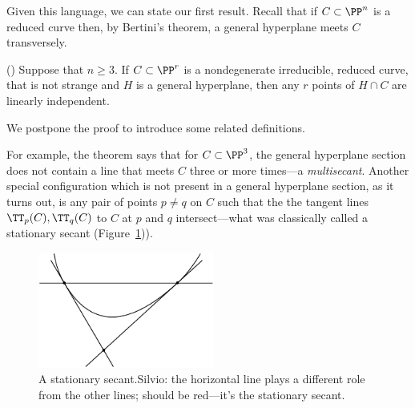 Given this language, we can state our first result. Recall that if $C\subset \PP^n$ is a reduced curve then, by Bertini's theorem, a general hyperplane meets $C$ transversely.

\begin{theorem} \label{basic linear independence}(\cite[Lemma 1.1]{Rathmann})\label{linear general position}
Suppose that $n\geq 3$. If $C\subset \PP^r$ is a nondegenerate irreducible, reduced curve, that is not strange
and $H$ is a general hyperplane, then any $r$ points of $H\cap C$ are
linearly independent.
\end{theorem}

We postpone the proof to introduce some related definitions.

For example, the theorem says that for $C \subset \PP^3$, the general hyperplane section does not contain a line
that meets $C$ three or more times---a \emph{multisecant}. Another special configuration which is not present in a general hyperplane section, as it turns out,
is any pair of points $p\neq q$ on $C$ such that the the tangent lines $\TT_p(C), \TT_q(C)$ to $C$ at $p$ and $q$ intersect---what was classically
called a stationary secant (Figure~\ref{Fig9.1})).


\begin{figure}
\centerline {\includegraphics[height=1.5in]{"main/Fig09-1"}}
\caption{A stationary secant.{Silvio: the horizontal line plays a different role from the other lines; should be red---it's the stationary secant.}}
\label{Fig9.1}
\end{figure}


